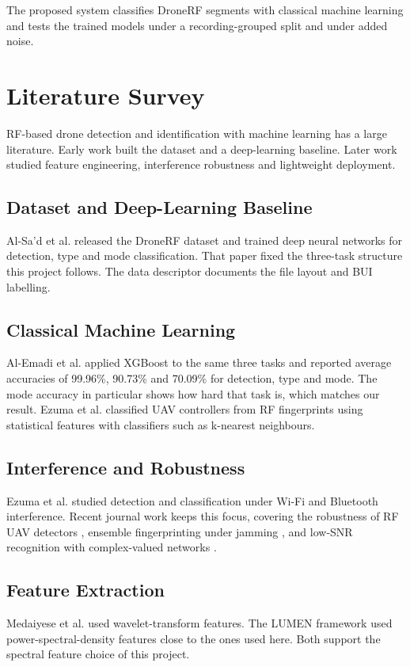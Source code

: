 \documentclass[11pt,conference,a4paper]{IEEEtran}
\begin{document}
The proposed system classifies DroneRF segments with classical machine learning
and tests the trained models under a recording-grouped split and under added
noise.

\section{Literature Survey}
RF-based drone detection and identification with machine learning has a large
literature. Early work built the dataset and a deep-learning baseline. Later
work studied feature engineering, interference robustness and lightweight
deployment.

\subsection{Dataset and Deep-Learning Baseline}
Al-Sa'd et al. \cite{alsad_fgcs} released the DroneRF dataset and trained deep
neural networks for detection, type and mode classification. That paper fixed
the three-task structure this project follows. The data descriptor
\cite{dronerf_dib} documents the file layout and BUI labelling.

\subsection{Classical Machine Learning}
Al-Emadi et al. \cite{alemadi_xgb} applied XGBoost to the same three tasks and
reported average accuracies of 99.96\%, 90.73\% and 70.09\% for detection, type
and mode. The mode accuracy in particular shows how hard that task is, which
matches our result. Ezuma et al. \cite{ezuma_micro} classified UAV controllers
from RF fingerprints using statistical features with classifiers such as
k-nearest neighbours.

\subsection{Interference and Robustness}
Ezuma et al. \cite{ezuma_interf} studied detection and classification under
Wi-Fi and Bluetooth interference. Recent journal work keeps this focus, covering
the robustness of RF UAV detectors \cite{robust_sensors}, ensemble
fingerprinting under jamming \cite{ensemble_sensors}, and low-SNR recognition
with complex-valued networks \cite{cvcnn_sensors}.

\subsection{Feature Extraction}
Medaiyese et al. \cite{medaiyese_wavelet} used wavelet-transform features. The
LUMEN framework \cite{lumen_sensors} used power-spectral-density features close
to the ones used here. Both support the spectral feature choice of this project.
\end{document}
